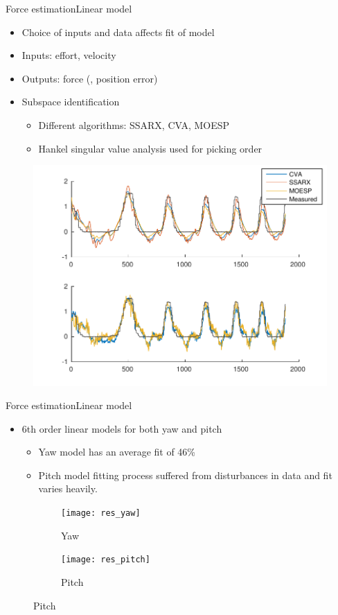 \begin{frame}{Force estimation}{Linear model}
\begin{itemize}
  \item Choice of inputs and data affects fit of model
  \item Inputs: effort, velocity 
  \item Outputs: force (, position error)
  \item Subspace identification
	\begin{itemize}
	\item Different algorithms: SSARX, CVA, MOESP
	\item Hankel singular value analysis used for picking order
	\end{itemize}
\end{itemize}
	
	\begin{figure}
	\centering
	\includegraphics[width=\linewidth]{Billeder/sscomparison1-eps-converted-to.pdf}
	\end{figure}
\end{frame}

\begin{frame}{Force estimation}{Linear model}
\begin{itemize}
\item 6th order linear models for both yaw and pitch
\begin{itemize}
\item Yaw model has an average fit of 46\%
\item Pitch model fitting process suffered from disturbances in data and fit varies heavily.
\end{itemize}
\end{itemize}
\begin{figure}
\centering
    \begin{subfigure}[t]{0.49\textwidth}
        \centering
        \texttt{[image: res\_yaw]} 
        \caption{Yaw} \label{fig:yawres}
    \end{subfigure}
        \begin{subfigure}[t]{0.49\textwidth}
        \centering
        \texttt{[image: res\_pitch]} 
        \caption{Pitch} \label{fig:pitchres}
    \end{subfigure}
\end{figure}
\end{frame}

